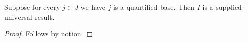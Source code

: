

\begin{theorem}\label{supplied_negative_wrong_bound}
    Suppose for every $j\in J$ we have $j$ is a quantified base.
    Then $I$ is a supplied-universal result.
\end{theorem}
\begin{proof}
    Follows by notion.
\end{proof}
